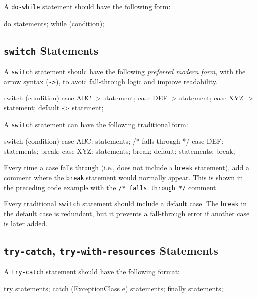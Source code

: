 \documentclass{article}
\begin{document}
A \texttt{do-while} statement should have the following form:

\begin{snippet}
do {
    statements;
} while (condition);
\end{snippet}

\subsection{\texttt{switch} Statements}

A \texttt{switch} statement should have the following \emph{preferred modern form}, with the arrow
syntax (\texttt{->}), to avoid fall-through logic and improve readability.

\begin{snippet}
switch (condition) {
    case ABC -> statement;
    case DEF -> statement;
    case XYZ -> statement;
    default -> statement;
}
\end{snippet}

A \texttt{switch} statement can have the following traditional form:

\begin{snippet}
switch (condition) {
    case ABC:
        statements;
        /* falls through */
    case DEF:
        statements;
        break;
    case XYZ:
        statements;
        break;
    default:
        statements;
        break;
}
\end{snippet}

Every time a case falls through (i.e., does not include a \texttt{break} statement), add a comment
where the \texttt{break} statement would normally appear. This is shown in the preceding code
example with the \texttt{/* falls through */} comment.

Every traditional \texttt{switch} statement should include a default case. The \texttt{break} in the
default case is redundant, but it prevents a fall-through error if another case is later added.

\subsection{\texttt{try-catch}, \texttt{try-with-resources} Statements}

A \texttt{try-catch} statement should have the following format:

\begin{snippet}
try {
    statements;
} catch (ExceptionClass e) {
    statements;
} finally {
    statements;
}
\end{snippet}
\end{document}
